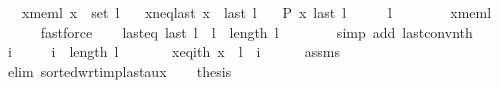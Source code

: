 \begin{isabellebody}
\ \ \ x{\isacharunderscore}{\kern0pt}mem{\isacharunderscore}{\kern0pt}l{\isacharcolon}{\kern0pt}\ {\isachardoublequoteopen}x\ {\isasymin}\ set\ l{\isachardoublequoteclose}\isanewline
\ \ \ x{\isacharunderscore}{\kern0pt}neq{\isacharunderscore}{\kern0pt}last{\isacharcolon}{\kern0pt}\ {\isachardoublequoteopen}x\ {\isasymnoteq}\ last\ l{\isachardoublequoteclose}\isanewline
\ \ \ {\isachardoublequoteopen}P\ x\ {\isacharparenleft}{\kern0pt}last\ l{\isacharparenright}{\kern0pt}{\isachardoublequoteclose}\isanewline
%
\isadelimproof
%
\endisadelimproof
%
\isatagproof
{}\isamarkupfalse%
\ {\isacharminus}{\kern0pt}\isanewline
\ \ \isamarkupfalse%
\ {\isachardoublequoteopen}l\ {\isasymnoteq}\ {\isacharbrackleft}{\kern0pt}{\isacharbrackright}{\kern0pt}{\isachardoublequoteclose}\isanewline
\ \ \ \ \isamarkupfalse%
\ x{\isacharunderscore}{\kern0pt}mem{\isacharunderscore}{\kern0pt}l\isanewline
\ \ \ \ \isamarkupfalse%
\ fastforce\isanewline
\ \ \isamarkupfalse%
\ last{\isacharunderscore}{\kern0pt}eq{\isacharcolon}{\kern0pt}\ {\isachardoublequoteopen}last\ l\ {\isacharequal}{\kern0pt}\ l\ {\isacharbang}{\kern0pt}\ {\isacharparenleft}{\kern0pt}length\ l\ {\isacharminus}{\kern0pt}\ {}{\isacharparenright}{\kern0pt}{\isachardoublequoteclose}\isanewline
\ \ \ \ \isamarkupfalse%
\ {\isacharparenleft}{\kern0pt}simp\ add{\isacharcolon}{\kern0pt}\ last{\isacharunderscore}{\kern0pt}conv{\isacharunderscore}{\kern0pt}nth{\isacharparenright}{\kern0pt}\isanewline
\ \ \isamarkupfalse%
\ i\ \isanewline
\ \ \ \ {\isachardoublequoteopen}i\ {\isacharless}{\kern0pt}\ length\ l\ {\isacharminus}{\kern0pt}\ {}{\isachardoublequoteclose}\ \isanewline
\ \ \ \ x{\isacharunderscore}{\kern0pt}eq{\isacharunderscore}{\kern0pt}ith{\isacharcolon}{\kern0pt}\ {\isachardoublequoteopen}x\ {\isacharequal}{\kern0pt}\ l\ {\isacharbang}{\kern0pt}\ i{\isachardoublequoteclose}\isanewline
\ \ \ \ \isamarkupfalse%
\ assms{\isacharparenleft}{\kern0pt}{}{\isacharcomma}{\kern0pt}\ {}{\isacharparenright}{\kern0pt}\isanewline
\ \ \ \ \isamarkupfalse%
\ {\isacharparenleft}{\kern0pt}elim\ sorted{\isacharunderscore}{\kern0pt}wrt{\isacharunderscore}{\kern0pt}imp{\isacharunderscore}{\kern0pt}last{\isacharunderscore}{\kern0pt}aux{\isacharparenright}{\kern0pt}\isanewline
\ \ \isamarkupfalse%
\ {\isacharquery}{\kern0pt}thesis\isanewline

\end{isabellebody}
